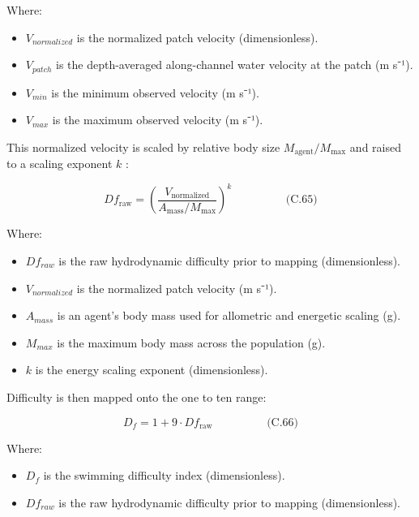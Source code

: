 \documentclass[
]{book}
\providecommand{\tightlist}{%
  \setlength{\itemsep}{0pt}\setlength{\parskip}{0pt}}
\begin{document}
Where:

\begin{itemize}
\tightlist
\item
  \(V_{normalized}\) is the normalized patch velocity (dimensionless).
\item
  \(V_{patch}\) is the depth-averaged along-channel water velocity at
  the patch (m s⁻¹).
\item
  \(V_{min}\) is the minimum observed velocity (m s⁻¹).
\item
  \(V_{max}\) is the maximum observed velocity (m s⁻¹).
\end{itemize}

This normalized velocity is scaled by relative body size
\(M_{\text{agent}} / M_{\max}\) and raised to a scaling exponent \(k\)
\citep{brown_toward_2004, gibson_selective_2001}:

\[
\begin{equation} Df_{\text{raw}} = 
\left(
\frac{V_{\text{normalized}}}{A_{\text{mass}} / M_{\max}}
\right)^k  \hspace{2cm} \text{(C.65)} \end{equation}
\]

Where:

\begin{itemize}
\tightlist
\item
  \(Df_{raw}\) is the raw hydrodynamic difficulty prior to mapping
  (dimensionless).
\item
  \(V_{normalized}\) is the normalized patch velocity (m s⁻¹).
\item
  \(A_{mass}\) is an agent's body mass used for allometric and energetic
  scaling (g).
\item
  \(M_{max}\) is the maximum body mass across the population (g).
\item
  \(k\) is the energy scaling exponent (dimensionless).
\end{itemize}

Difficulty is then mapped onto the one to ten range:

\[
\begin{equation} D_f = 1 + 9 \cdot Df_{\text{raw}}  \hspace{2cm} \text{(C.66)} \end{equation}
\]

Where:

\begin{itemize}
\tightlist
\item
  \(D_f\) is the swimming difficulty index (dimensionless).
\item
  \(Df_{raw}\) is the raw hydrodynamic difficulty prior to mapping
  (dimensionless).
\end{itemize}
\end{document}
